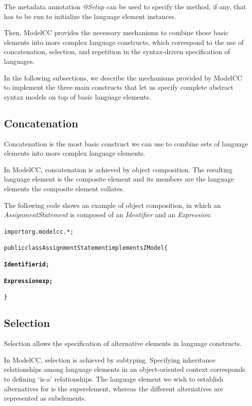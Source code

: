 \documentclass[a4paper,twoside,onecolumn]{article}
\newenvironment{colframe}{%
  \begin{Sbox} 
    \begin{minipage}{.8\columnwidth} 
}{%

  \end{minipage} 
  \end{Sbox} 
  \begin{center} 
    \fcolorbox{black}{MyGray}{\TheSbox} 
  \end{center} 
}
\begin{document}
The metadata annotation \emph{@Setup} can be used to specify the method, if any, that has to be run to initialize the language element instances.

Then, ModelCC provides the necessary mechanisms to combine those basic elements into more complex language constructs, which correspond to the use of concatenation, selection, and repetition in the syntax-driven specification of languages.

In the following subsections, we describe the mechanisms provided by ModelCC to implement the three main constructs that let us specify complete abstract syntax models on top of basic
language elements.

\subsection{Concatenation}

Concatenation is the most basic construct we can use to combine sets of language elements into more complex language elements.

In ModelCC, concatenation is achieved by object composition. The resulting language element is the composite element and its members are the language elements the composite element collates.

The following code shows an example of object composition, in which an \emph{AssignmentStatement} is composed of an \emph{Identifier} and an \emph{Expression}:

\begin{colframe}
\begin{alltt}
import org.modelcc.*;

public class AssignmentStatement implements{\emph IModel} \{

  {\bf Identifier id;}

  {\bf Expression exp;}

\}
\end{alltt}
\end{colframe}

\subsection{Selection}

Selection allows the specification of alternative elements in language constructs.

In ModelCC, selection is achieved by subtyping. Specifying inheritance relationships among language elements in an object-oriented context
corresponds to defining `is-a' relationships. The language element we wish to establish alternatives for is the superelement, whereas the different alternatives are
represented as subelements.
\end{document}
